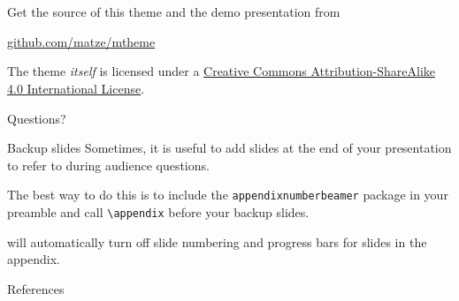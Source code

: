 \documentclass[10pt,aspectratio=169,english]{beamer}
\begin{document}
\section{}

\begin{frame}{}

  Get the source of this theme and the demo presentation from

  \begin{center}\url{github.com/matze/mtheme}\end{center}

  The theme \emph{itself} is licensed under a
  \href{http://creativecommons.org/licenses/by-sa/4.0/}{Creative Commons
  Attribution-ShareAlike 4.0 International License}.

  \begin{center}\ccbysa\end{center}

\end{frame}

\begin{frame}[standout]
  Questions?
\end{frame}

\appendix

\begin{frame}[fragile]{Backup slides}
  Sometimes, it is useful to add slides at the end of your presentation to
  refer to during audience questions.

  The best way to do this is to include the \verb|appendixnumberbeamer|
  package in your preamble and call \verb|\appendix| before your backup slides.

  \themename will automatically turn off slide numbering and progress bars for
  slides in the appendix.
\end{frame}

\begin{frame}[allowframebreaks]{References}

  
  

\end{frame}
\end{document}
